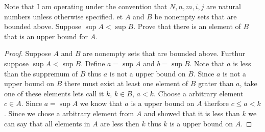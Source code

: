 \documentclass[12pt]{article}
\makeatletter
\theoremstyle{homework}
\newenvironment{exercise}[1]
{\def\@currentlabel{#1}\exercisecore}
{\endexercisecore}
\makeatother
\begin{document}
Note that I am operating under the convention that $N,n,m,i,j$ are natural numbers unless otherwise specified.
\begin{exercise}

Let $A$ and $B$ be nonempty sets that are bounded above. Suppose $\sup A < \sup B$. Prove that there is an element of $B$ that is an upper bound for $A$.
\end{exercise}
\begin{proof}
Suppose $A$ and $B$ are nonempty sets that are bounded above. Furthur suppose $\sup A < \sup B$. Define $a=\sup A$ and $b=\sup B$.  Note that $a$ is less than the suppremum of $B$ thus $a$ is not a upper bound on $B$.  Since $a$ is not a upper bound on $B$ there must exist at least one element of $B$ grater than $a$, take one of these elements lets call it $k$, $k\in B$, $a<k$.  Choose a arbitrary element $c\in A$.  Since $a=\sup A$ we know that $a$ is a upper bound on $A$ therfore $c\leq a < k$.  Since we chose a arbitrary element from $A$ and showed that it is less than $k$ we can say that all elements in $A$ are less then $k$ thus $k$ is a upper bound on $A$.
\end{proof}
\end{document}
